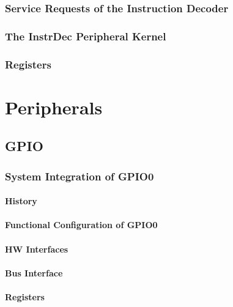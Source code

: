 \subsection{Service Requests of the Instruction Decoder}

\subsection{The InstrDec Peripheral Kernel}


\subsection{Registers}


\chapter{Peripherals}
\section{GPIO} %
\label{sec:gpiofunc01}
\subsection{System Integration of GPIO0}
\subsubsection{History}


\subsubsection{Functional Configuration of GPIO0}


\subsubsection{HW Interfaces}


\subsubsection{Bus Interface}

\subsubsection{Registers}

